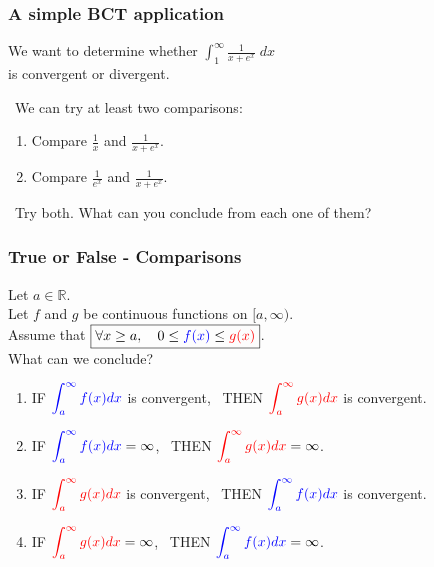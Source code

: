 \documentclass[14pt]{beamer}
\newcommand{\R}{\mathbb{R}}
\newcommand{\azul}[1]{{\color{blue} #1}}
\newcommand{\rojo}[1]{{\color{red} #1}}
\newcommand{\setsize}[1]{\fontsize{#1}{#1}\selectfont} %
\newcommand{\smallerfont}{\setsize{13}} %
\begin{document}
	\begin{frame}[t]
		\smallerfont
		\frametitle{A simple BCT application}

		We want to determine whether
		${\displaystyle \int_1^{\infty} \frac{1}{x+e^{x}} \; dx}$ \\ is convergent
		or divergent.

		\
 We can try at least two comparisons:

		\begin{enumerate}
			\item Compare ${\displaystyle \frac{1}{x}}$ and ${\displaystyle \frac{1}{x+ e^{x}}}$.

			\item Compare ${\displaystyle \frac{1}{e^{x}}}$ and ${\displaystyle \frac{1}{x+ e^{x}}}$.
		\end{enumerate}

		\
 Try both. What can you conclude from each one of them?
	\end{frame}

	\begin{frame}[t]
		\setsize{11}
		\frametitle{True or False - Comparisons}

		Let $a \in \R$. \\ Let $f$ and $g$ be continuous functions on $[a, \infty)$.
		\\ Assume that ${\displaystyle \boxed{\forall x \geq a, \quad 0 \leq \azul{f(x)} \leq \rojo{g(x)}}}$.
		\\ What can we conclude?

		\begin{enumerate}
			\item IF ${\displaystyle \azul{\int_a^{\infty} f(x) dx}}$ is convergent,
				\, THEN ${\displaystyle \rojo{\int_a^{\infty} g(x) dx}}$ is convergent.

			\item IF ${\displaystyle \azul{\int_a^{\infty} f(x) dx} = \infty}$, \,
				THEN ${\displaystyle \rojo{\int_a^{\infty} g(x) dx} = \infty}$.

			\item IF ${\displaystyle \rojo{\int_a^{\infty} g(x) dx}}$ is convergent,
				\, THEN ${\displaystyle \azul{\int_a^{\infty} f(x) dx}}$ is convergent.

			\item IF ${\displaystyle \rojo{\int_a^{\infty} g(x) dx} = \infty}$, \,
				THEN ${\displaystyle \azul{\int_a^{\infty} f(x) dx} = \infty}$.
		\end{enumerate}
	\end{frame}
\end{document}
